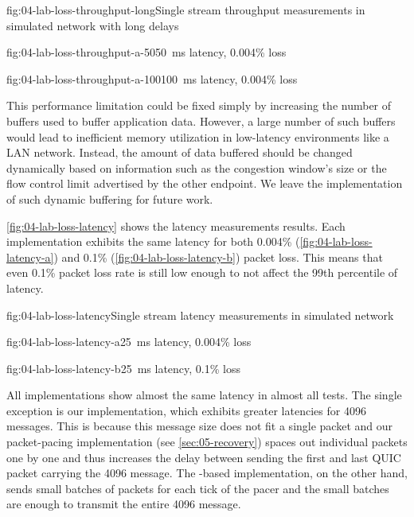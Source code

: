 \begin{myFigure}{fig:04-lab-loss-throughput-long}{Single stream throughput measurements in simulated network with long delays}
\begin{mySubfigure}{0.49\linewidth}{fig:04-lab-loss-throughput-a-50}{\SI{50}{\milli\second} latency, 0.004\% loss}
\footnotesize

\end{mySubfigure}
\begin{mySubfigure}{0.49\linewidth}{fig:04-lab-loss-throughput-a-100}{\SI{100}{\milli\second} latency, 0.004\% loss}
\footnotesize

\end{mySubfigure}
\end{myFigure}

This performance limitation could be fixed simply by increasing the number of buffers used to buffer
application data. However, a large number of such buffers would lead to inefficient memory
utilization in low-latency environments like a LAN network. Instead, the amount of data buffered
should be changed dynamically based on information such as the congestion window's size or the flow
control limit advertised by the other endpoint. We leave the implementation of such dynamic
buffering for future work.

\autoref{fig:04-lab-loss-latency} shows the latency measurements results. Each implementation
exhibits the same latency for both 0.004\% (\autoref{fig:04-lab-loss-latency-a}) and 0.1\%
(\autoref{fig:04-lab-loss-latency-b}) packet loss. This means that even 0.1\% packet loss rate is
still low enough to not affect the 99th percentile of latency.

\begin{myFigure}{fig:04-lab-loss-latency}{Single stream latency measurements in simulated network}
\begin{mySubfigure}{0.49\linewidth}{fig:04-lab-loss-latency-a}{\SI{25}{\milli\second} latency, 0.004\% loss}
\footnotesize

\end{mySubfigure}
\begin{mySubfigure}{0.49\linewidth}{fig:04-lab-loss-latency-b}{\SI{25}{\milli\second} latency, 0.1\% loss}
\footnotesize

\end{mySubfigure}
\end{myFigure}

All implementations show almost the same latency in almost all tests. The single exception is our
implementation, which exhibits greater latencies for \SI{4096}{\byte} messages. This is because this
message size does not fit a single packet and our \gls{packet-pacing} implementation (see
\autoref{sec:05-recovery}) spaces out individual packets one by one and thus increases the delay
between sending the first and last QUIC packet carrying the \SI{4096}{\byte} message. The
\libmsquic{}-based implementation, on the other hand, sends small batches of packets for each tick
of the pacer and the small batches are enough to transmit the entire \SI{4096}{\byte} message.

